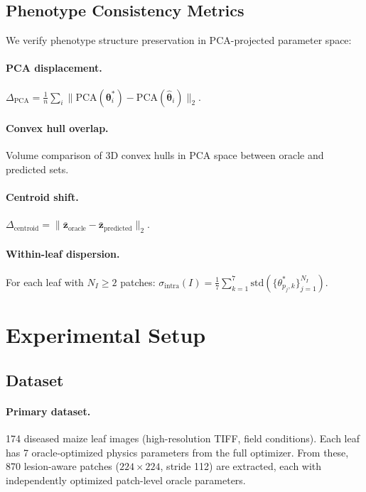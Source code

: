 \documentclass[11pt,a4paper]{article}
\newcommand{\btheta}{\boldsymbol{\theta}}
\begin{document}
\subsection{Phenotype Consistency Metrics}

We verify phenotype structure preservation in PCA-projected parameter space:

\paragraph{PCA displacement.}
$\Delta_\text{PCA} = \frac{1}{n}\sum_i \|\text{PCA}(\btheta^*_i) - \text{PCA}(\hat{\btheta}_i)\|_2$.

\paragraph{Convex hull overlap.}
Volume comparison of 3D convex hulls in PCA space between oracle and predicted sets.

\paragraph{Centroid shift.}
$\Delta_\text{centroid} = \|\bar{\mathbf{z}}_\text{oracle} - \bar{\mathbf{z}}_\text{predicted}\|_2$.

\paragraph{Within-leaf dispersion.}
For each leaf with $N_I \geq 2$ patches:
$\sigma_\text{intra}(I) = \frac{1}{7}\sum_{k=1}^7 \text{std}(\{\theta^*_{p_j,k}\}_{j=1}^{N_I})$.

\section{Experimental Setup}
\label{sec:experiments}

\subsection{Dataset}

\paragraph{Primary dataset.}
174 diseased maize leaf images (high-resolution TIFF, field conditions).
Each leaf has 7 oracle-optimized physics parameters from the full optimizer.
From these, 870 lesion-aware patches ($224{\times}224$, stride 112) are extracted,
each with independently optimized patch-level oracle parameters.
\end{document}
